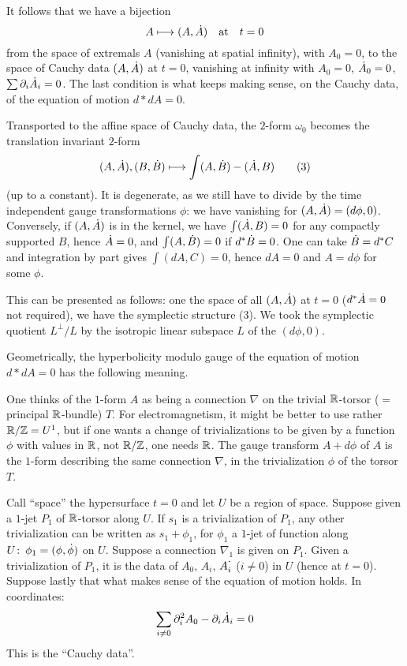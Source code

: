 It follows that we have a bijection
$$
A\longmapsto (A,\Dot{A})\quad\text{at}\quad t=0
$$
from the space of extremals $A$ (vanishing at spatial
infinity), with $A_0=0$, to the space of Cauchy data
$(A,\Dot{A})$ at $t=0$, vanishing at infinity with
$A_0=0$, $\Dot{A}_0=0$, $\sum\partial_i \Dot{A}_i=0$.
The last condition is what keeps making sense, on the
Cauchy data, of the equation of motion $d*dA=0$.

Transported to the affine space of Cauchy data, the
$2$-form $\omega_0$ becomes the translation invariant
$2$-form
$$
(A,\Adot),(B,\Bdot)\longmapsto \int (A,\Bdot)-(\Adot,B)
\tag3
$$
(up to a constant).
It is degenerate, as we still have to divide by the time
independent gauge transformations $\phi$:
we have vanishing for $(A,\Dot{A})=(d\phi,0)$.
Conversely, if $(A,\Dot{A})$ is in the kernel, we have
$\int(\Dot{A},B)=0$ for any compactly supported
$B$, hence $\Dot{A}=0$, and $\int(A,\Dot{B})=0$ if $d^*\Dot{B}=0$.
One can take $\Dot{B}=d^*C$ and integration by part gives
$\int (dA,C)=0$, hence $dA=0$ and $A=d\phi$ for some
$\phi$.

This can be presented as follows:
one the space of all $(A,\Dot{A})$ at $t=0$ ($d^*\Dot{A}=0$
not required), we have the symplectic structure (3).
We took the symplectic quotient $L^\bot/L$ by the
isotropic linear subspace $L$ of the $(d\phi,0)$.

Geometrically, the hyperbolicity modulo gauge of the
equation of motion $d*dA=0$ has the following meaning.

One thinks of the $1$-form $A$ as being a connection
$\nabla$ on the trivial ${\Bbb R}$-torsor ($=$ principal
${\Bbb R}$-bundle) $T$.
For electromagnetism, it might be better to use rather
${\Bbb R}/{\Bbb Z}=U^1$, but if one wants a change of
trivializations to be given by a function $\phi$ with
values in ${\Bbb R}$, not ${\Bbb R}/{\Bbb Z}$, one needs ${\Bbb R}$.
The gauge transform $A+d\phi$ of $A$ is the $1$-form
describing the same connection $\nabla$, in the
trivialization $\phi$ of the torsor $T$.

Call ``space'' the hypersurface $t=0$ and let $U$ be a
region of space. 
Suppose given a $1$-jet $P_1$ of ${\Bbb R}$-torsor along
$U$.
If $s_1$ is a trivialization of $P_1$, any other
trivialization can be written as $s_1+\phi_1$, for
$\phi_1$ a $1$-jet of function along
$U\colon\,\phi_1=(\phi,\Dot{\phi})$ on $U$.
Suppose a connection $\nabla_1$ is given on $P_1$.
Given a trivialization of $P_1$, it is the data of
$A_0$, $A_i$, 
$A_i^{\raise1pt\hbox{$\bold{\cdot}$}}$ ($i\not=0$) in $U$
(hence at $t=0$).
Suppose lastly that what makes sense of the equation of
motion holds.
In coordinates:
$$
\sum\limits_{i\not=0}\partial_i^2 A_0-\partial_i
\Dot{A}_i=0
$$
This is the ``Cauchy data''.


